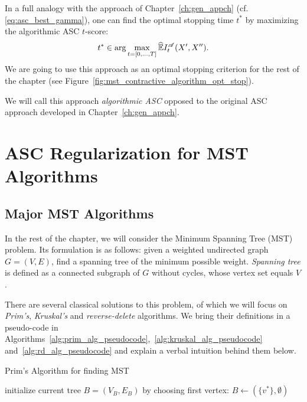 In a full analogy with the approach of Chapter~\ref{ch:gen_appch}
(cf.\eqref{eq:asc_best_gamma}), one can find the optimal stopping time $t^*$ by
maximizing the algorithmic ASC $t$-score:
\begin{equation}\label{eq:mst_asc_best_step}
  t^* \in \arg \max_{t = [0, \ldots, T]} \widehat {\mathbb{E}} I^{\mathscr{A}}_t(X', X'').
\end{equation}
%
We are going to use this approach as an optimal stopping criterion for the 
rest of the chapter (see Figure~\ref{fig:mst_contractive_algorithm_opt_stop}).

\myremark We will call this approach \textit{algorithmic ASC} opposed to the
original ASC approach developed in Chapter~\ref{ch:gen_appch}.

\section{ASC Regularization for MST Algorithms}
\label{sec:applying_asc_to_mst}

\subsection{Major MST Algorithms}
In the rest of the chapter, we will consider the Minimum Spanning Tree (MST)
problem. Its formulation is as follows: given a weighted undirected graph $G =
(V, E)$, find a spanning tree of the minimum possible weight. \textit{Spanning
tree} is defined as a connected subgraph of $G$ without cycles, whose vertex set
equals $V$.

There are several classical solutions to this problem, of which we will focus on
\textit{Prim's}, \textit{Kruskal's} and \textit{reverse-delete} algorithms. We
bring their definitions in a pseudo-code in
Algorithms~\ref{alg:prim_alg_pseudocode},~\ref{alg:kruskal_alg_pseudocode}
and~\ref{alg:rd_alg_pseudocode} and explain a verbal intuition behind them below.


\begin{algorithm}[ht!]
\caption{Prim's Algorithm for finding MST}\label{alg:prim_alg_pseudocode}
{initialize current tree $B = (V_B, E_B)$ by choosing first vertex: 
  $B \leftarrow (\{v^*\}, \emptyset)$\;}


\end{algorithm}

